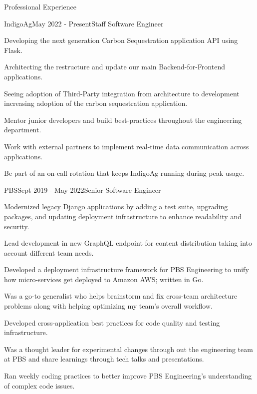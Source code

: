 \documentclass{bluefin_cv}
\begin{document}
\begin{bfcvSection}{Professional Experience}

\begin{bfcvWorkSubsection}{IndigoAg}{May 2022 - Present}{Staff Software Engineer}
\item Developing the next generation Carbon Sequestration application API using Flask.
\item Architecting the restructure and update our main Backend-for-Frontend applications.
\item Seeing adoption of Third-Party integration from architecture to development increasing adoption of the carbon sequestration application.
\item Mentor junior developers and build best-practices throughout the engineering department.
\item Work with external partners to implement real-time data communication across applications.
\item Be part of an on-call rotation that keeps IndigoAg running during peak usage.
\end{bfcvWorkSubsection}

\begin{bfcvWorkSubsection}{PBS}{Sept 2019 - May 2022}{Senior Software Engineer}
\item Modernized legacy Django applications by adding a test suite, upgrading packages, and updating deployment infrastructure to enhance readability and security.
\item Lead development in new GraphQL endpoint for content distribution taking into account different team needs.
\item Developed a deployment infrastructure framework for PBS Engineering to unify how micro-services get deployed to Amazon AWS; written in Go.
\item Was a go-to generalist who helps brainstorm and fix cross-team architecture problems along with helping optimizing my team's overall workflow.
\item Developed cross-application best practices for code quality and testing infrastructure.
\item Was a thought leader for experimental changes through out the engineering team at PBS and share learnings through tech talks and presentations.
\item Ran weekly coding practices to better improve PBS Engineering's understanding of complex code issues.
\end{bfcvWorkSubsection}


\end{bfcvSection}
\end{document}
